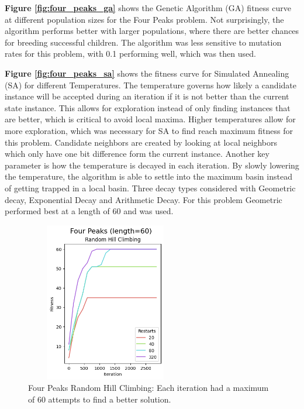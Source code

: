 \documentclass[letterpaper]{article} %
\begin{document}
 \textbf{Figure \ref{fig:four_peaks_ga}} shows the Genetic Algorithm (GA) fitness curve at different population sizes for the Four Peaks problem.  Not surprisingly, the algorithm performs better with larger populations, where there are better chances for breeding successful children.  The algorithm was less sensitive to mutation rates for this problem, with 0.1 performing well, which was then used.



\textbf{Figure \ref{fig:four_peaks_sa}} shows the fitness curve for Simulated Annealing (SA) for different Temperatures.  The temperature governs how likely a candidate instance will be accepted during an iteration if it is not better than the current state instance.  This allows for exploration instead of only finding instances that are better, which is critical to avoid local maxima.    Higher temperatures allow for more exploration, which was necessary for SA to find reach maximum fitness for this problem.  Candidate neighbors are created by looking at local neighbors which only have one bit difference form the current instance.  Another key parameter is how the temperature is decayed in each iteration.  By slowly lowering the temperature, the algorithm is able to settle into the maximum basin instead of getting trapped in a local basin.  Three decay types considered with Geometric decay, Exponential Decay and Arithmetic Decay.  For this problem Geometric performed best at a length of 60 and was used.


\begin{figure}[!htb]
\centering
\includegraphics[width=2.75in, height=2.75in]{figures/Four_Peaks_length=60_Random_Hill_Climbing_l_60_ma_120_r_20__40__80__320_.png}
\caption{Four Peaks Random Hill Climbing: Each iteration had a maximum of 60 attempts to find a better solution. }
\label{fig:four_peaks_rhc}
\end{figure}
\end{document}
